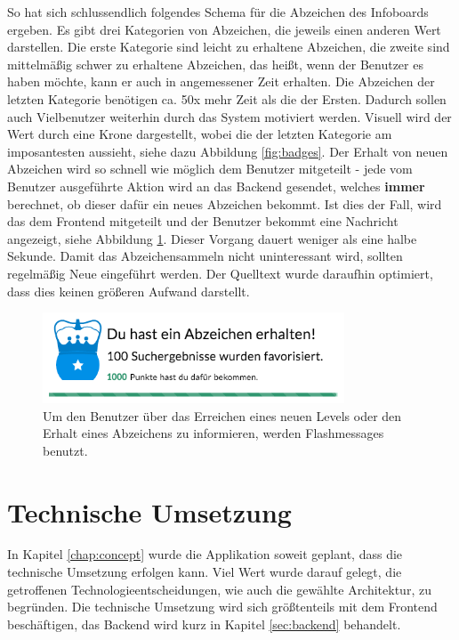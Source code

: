 \documentclass[12pt,twoside]{book}
\begin{document}
So hat sich schlussendlich folgendes Schema für die Abzeichen des Infoboards ergeben. Es gibt drei Kategorien von Abzeichen, die jeweils einen anderen Wert darstellen. Die erste Kategorie sind leicht zu erhaltene Abzeichen, die zweite sind mittelmäßig schwer zu erhaltene Abzeichen, das heißt, wenn der Benutzer es haben möchte, kann er auch in angemessener Zeit erhalten. Die Abzeichen der letzten Kategorie benötigen ca. 50x mehr Zeit als die der Ersten. Dadurch sollen auch Vielbenutzer weiterhin durch das System motiviert werden. Visuell wird der Wert durch eine Krone dargestellt, wobei die der letzten Kategorie am imposantesten aussieht, siehe dazu Abbildung \ref{fig:badges}.
Der Erhalt von neuen Abzeichen wird so schnell wie möglich dem Benutzer mitgeteilt - jede vom Benutzer ausgeführte Aktion wird an das Backend gesendet, welches \textbf{immer} berechnet, ob dieser dafür ein neues Abzeichen bekommt. Ist dies der Fall, wird das dem Frontend mitgeteilt und der Benutzer bekommt eine Nachricht angezeigt, siehe Abbildung \ref{fig:flashmessage}. Dieser Vorgang dauert weniger als eine halbe Sekunde.
Damit das Abzeichensammeln nicht uninteressant wird, sollten regelmäßig Neue eingeführt werden. Der Quelltext wurde daraufhin optimiert, dass dies keinen größeren Aufwand darstellt.

\begin{figure}[htbp]
    \centering
    \includegraphics[width=0.8\textwidth]{images/infoboard_flashmessage.png}
    \caption{Um den Benutzer über das Erreichen eines neuen Levels oder den Erhalt eines Abzeichens zu informieren, werden Flashmessages benutzt.}
    \label{fig:flashmessage}
\end{figure}

\chapter{Technische Umsetzung}\label{chap:tech}

In Kapitel \ref{chap:concept} wurde die Applikation soweit geplant, dass die technische Umsetzung erfolgen kann. Viel Wert wurde darauf gelegt, die getroffenen Technologieentscheidungen, wie auch die gewählte Architektur, zu begründen.
Die technische Umsetzung wird sich größtenteils mit dem Frontend beschäftigen, das Backend wird kurz in Kapitel \ref{sec:backend} behandelt.
\end{document}
